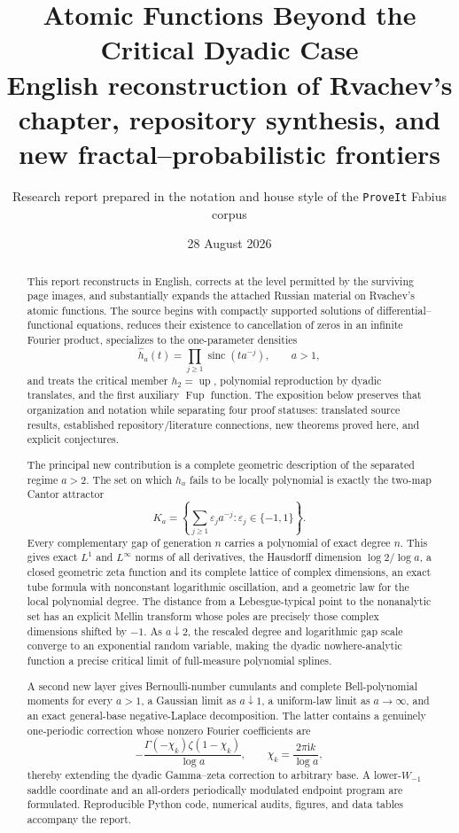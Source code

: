 \documentclass[11pt,oneside]{article}
\title{\bfseries Atomic Functions Beyond the Critical Dyadic Case\\[0.35em]
\large English reconstruction of Rvachev's chapter, repository synthesis, and new fractal--probabilistic frontiers}
\author{Research report prepared in the notation and house style of the \texttt{ProveIt} Fabius corpus}
\date{28 August 2026}
\theoremstyle{definition}
\theoremstyle{remark}
\newcommand{\Up}{\operatorname{up}}
\newcommand{\sinc}{\operatorname{sinc}}
\newcommand{\ii}{\mathrm i}
\newcommand{\eps}{\varepsilon}
\begin{document}
\maketitle

\begin{abstract}
This report reconstructs in English, corrects at the level permitted by the surviving page images, and substantially expands the attached Russian material on Rvachev's atomic functions.  The source begins with compactly supported solutions of differential--functional equations, reduces their existence to cancellation of zeros in an infinite Fourier product, specializes to the one-parameter densities
\[
 \widehat h_a(t)=\prod_{j\ge1}\sinc(t a^{-j}),\qquad a>1,
\]
and treats the critical member $h_2=\Up$, polynomial reproduction by dyadic translates, and the first auxiliary $\operatorname{Fup}$ function.  The exposition below preserves that organization and notation while separating four proof statuses: translated source results, established repository/literature connections, new theorems proved here, and explicit conjectures.

The principal new contribution is a complete geometric description of the separated regime $a>2$.  The set on which $h_a$ fails to be locally polynomial is exactly the two-map Cantor attractor
\[
 K_a=\left\{\sum_{j\ge1}\eps_j a^{-j}:\eps_j\in\{-1,1\}\right\}.
\]
Every complementary gap of generation $n$ carries a polynomial of exact degree $n$.  This gives exact $L^1$ and $L^\infty$ norms of all derivatives, the Hausdorff dimension $\log2/\log a$, a closed geometric zeta function and its complete lattice of complex dimensions, an exact tube formula with nonconstant logarithmic oscillation, and a geometric law for the local polynomial degree.  The distance from a Lebesgue-typical point to the nonanalytic set has an explicit Mellin transform whose poles are precisely those complex dimensions shifted by $-1$.  As $a\downarrow2$, the rescaled degree and logarithmic gap scale converge to an exponential random variable, making the dyadic nowhere-analytic function a precise critical limit of full-measure polynomial splines.

A second new layer gives Bernoulli-number cumulants and complete Bell-polynomial moments for every $a>1$, a Gaussian limit as $a\downarrow1$, a uniform-law limit as $a\to\infty$, and an exact general-base negative-Laplace decomposition.  The latter contains a genuinely one-periodic correction whose nonzero Fourier coefficients are
\[
 -\frac{\Gamma(-\chi_k)\zeta(1-\chi_k)}{\log a},\qquad
 \chi_k=\frac{2\pi\ii k}{\log a},
\]
thereby extending the dyadic Gamma--zeta correction to arbitrary base.  A lower-$W_{-1}$ saddle coordinate and an all-orders periodically modulated endpoint program are formulated.  Reproducible Python code, numerical audits, figures, and data tables accompany the report.
\end{abstract}
\end{document}
